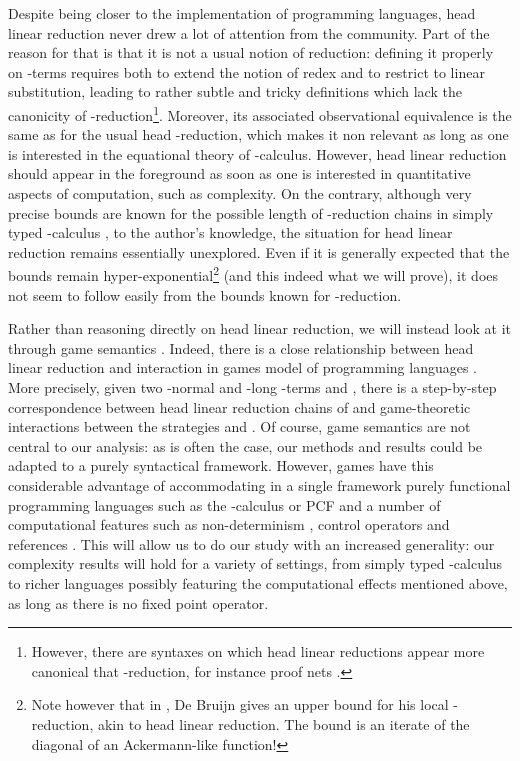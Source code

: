 \documentclass{article}
\begin{document}
Despite being closer to the implementation of programming languages, head linear reduction never drew a lot of attention from the community. Part of the reason for that is that it is not a usual notion of reduction:
defining it properly on -terms requires both to extend the notion of redex and to restrict to linear substitution, leading to rather subtle and tricky definitions which lack the canonicity of 
-reduction\footnote{However, there are syntaxes on which head linear reductions appear more canonical that -reduction, for instance proof nets \cite{DBLP:journals/tcs/MascariP94}.}. 
Moreover, its associated observational equivalence is the same as for the usual head -reduction, which makes it non relevant as long as one is
interested in the equational theory of -calculus.
However, head linear reduction should appear in the foreground as soon as one is interested in quantitative aspects of computation, such as complexity. On the contrary, although very precise bounds are known for the possible length of -reduction chains in simply typed -calculus \cite{schwichtenberg1982complexity,beckmann2001exact}, to the author's knowledge, the situation for head linear reduction remains essentially
unexplored. Even if it is generally expected that the bounds remain hyper-exponential\footnote{Note however that in \cite{de1987generalizing}, De Bruijn gives an upper bound for his local -reduction, akin to head linear
reduction. The bound is an iterate of the diagonal of an Ackermann-like function!}  (and this indeed what we will prove), it does not seem to follow easily from the bounds known for -reduction.


Rather than reasoning directly on head linear reduction, we will instead look at it through game semantics \cite{hyland-ong}. Indeed, there is a close relationship between head linear reduction and interaction in games
model of programming languages \cite{danosregnier}. More precisely, given two -normal and -long -terms  and , there is a step-by-step correspondence between head linear reduction chains of  and 
game-theoretic interactions between the strategies  and . Of course, game semantics are not central to our analysis: as is often the case, our methods and results could be adapted to a purely syntactical
framework. However, games have this considerable advantage of accommodating in a single framework purely functional programming languages such as the -calculus or PCF and a number of computational features such as 
non-determinism \cite{DBLP:conf/lics/HarmerM99}, control operators \cite{DBLP:conf/lics/Laird97} and references \cite{abramsky-mccusker:active-algol}. This will allow us to do our study with an increased generality:
our complexity results will hold for a variety of settings, from simply typed -calculus to richer languages possibly featuring the computational effects mentioned above, as long as there is no
fixed point operator.
\end{document}

